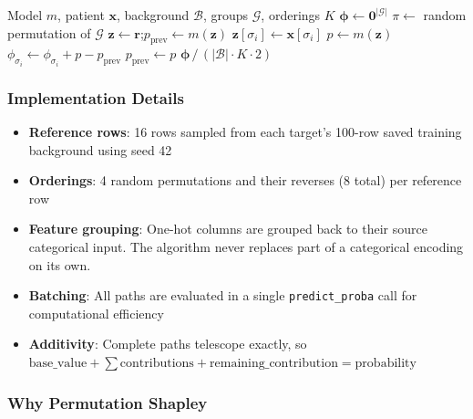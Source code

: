 \documentclass[conference]{IEEEtran}
\begin{document}
\begin{algorithm}[!t]
\caption{Grouped Permutation Shapley}
\label{alg:shapley}
\footnotesize
\algrenewcommand\algorithmicindent{0.9em}
\begin{algorithmic}[1]
\Require Model $m$, patient $\mathbf{x}$, background $\mathcal{B}$, groups $\mathcal{G}$, orderings $K$
\State $\boldsymbol{\phi} \gets \mathbf{0}^{|\mathcal{G}|}$
        \State $\pi \gets$ random permutation of $\mathcal{G}$
            \State $\mathbf{z} \gets \mathbf{r}$;\quad $p_{\text{prev}} \gets m(\mathbf{z})$
                \State $\mathbf{z}[\sigma_i] \gets \mathbf{x}[\sigma_i]$
                \State $p \gets m(\mathbf{z})$
                \State $\phi_{\sigma_i} \gets \phi_{\sigma_i} + p - p_{\text{prev}}$
                \State $p_{\text{prev}} \gets p$
            \EndFor
        \EndFor
    \EndFor
\EndFor
\State \Return $\boldsymbol{\phi} \,/\, (|\mathcal{B}| \cdot K \cdot 2)$
\end{algorithmic}
\end{algorithm}

\subsubsection{Implementation Details}

\begin{itemize}
    \item \textbf{Reference rows}: 16 rows sampled from each target's 100-row saved training background using seed 42
    \item \textbf{Orderings}: 4 random permutations and their reverses (8 total) per reference row
    \item \textbf{Feature grouping}: One-hot columns are grouped back to their source categorical input. The algorithm never replaces part of a categorical encoding on its own.
    \item \textbf{Batching}: All paths are evaluated in a single \texttt{predict\_proba} call for computational efficiency
    \item \textbf{Additivity}: Complete paths telescope exactly, so $\text{base\_value} + \sum \text{contributions} + \text{remaining\_contribution} = \text{probability}$
\end{itemize}

\subsubsection{Why Permutation Shapley}
\end{document}
